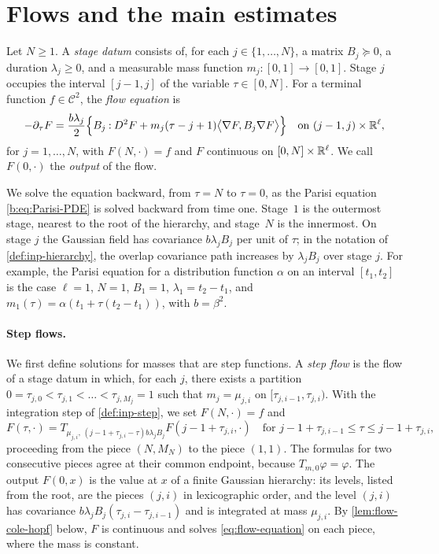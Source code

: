 \section{Flows and the main estimates}\label{sec:flow-statements}

\begin{definition}\label{def:flow}
Let $N\ge1$. A \emph{stage datum} consists of, for each $j\in\{1,\dots,N\}$, a
matrix $B_j\succeq0$, a duration $\lambda_j\ge0$, and a measurable mass function
$m_j\colon[0,1]\to[0,1]$. Stage $j$ occupies the interval $[j-1,j]$ of the
variable $\tau\in[0,N]$. For a terminal function $f\in\mathcal C^2$, the
\emph{flow equation} is
\begin{equation}\label{eq:flow-equation}
 -\partial_\tau F=\frac{b\lambda_j}{2}\Bigl\{B_j\mathbin{:}D^2F
 +m_j(\tau-j+1)\bigl\langle\nabla F,B_j\nabla F\bigr\rangle\Bigr\}
 \quad\text{on }(j-1,j)\times\mathbb R^\ell,
\end{equation}
for $j=1,\dots,N$, with $F(N,\cdot)=f$ and $F$ continuous on
$[0,N]\times\mathbb R^\ell$. We call $F(0,\cdot)$ the \emph{output} of the flow.
\end{definition}

We solve the equation backward, from $\tau=N$ to $\tau=0$, as the Parisi
equation \eqref{b:eq:Parisi-PDE} is solved backward from time one. Stage~$1$ is
the outermost stage, nearest to the root of the hierarchy, and stage~$N$ is the
innermost. On stage $j$ the Gaussian field has covariance $b\lambda_jB_j$ per unit
of $\tau$; in the notation of \cref{def:inp-hierarchy}, the overlap covariance
path increases by $\lambda_jB_j$ over stage $j$. For example, the Parisi equation
for a distribution function $\alpha$ on an interval $[t_1,t_2]$ is the case
$\ell=1$, $N=1$, $B_1=1$, $\lambda_1=t_2-t_1$, and
$m_1(\tau)=\alpha(t_1+\tau(t_2-t_1))$, with $b=\beta^2$.

\paragraph{Step flows.}
We first define solutions for masses that are step functions. A \emph{step
flow} is the flow of a stage datum in which, for each $j$, there exists a partition
$0=\tau_{j,0}<\tau_{j,1}<\dots<\tau_{j,M_j}=1$ such that $m_j=\mu_{j,i}$ on
$[\tau_{j,i-1},\tau_{j,i})$. With the integration step of
\cref{def:inp-step}, we set $F(N,\cdot)=f$ and
\begin{equation}\label{eq:flow-step-solution}
 F(\tau,\cdot)=T_{\mu_{j,i},\,(j-1+\tau_{j,i}-\tau)b\lambda_jB_j}
 F(j-1+\tau_{j,i},\cdot)
 \quad\text{for } j-1+\tau_{j,i-1}\le\tau\le j-1+\tau_{j,i},
\end{equation}
proceeding from the piece $(N,M_N)$ to the piece $(1,1)$. The formulas for two
consecutive pieces agree at their common endpoint, because
$T_{m,0}\varphi=\varphi$. The output $F(0,x)$ is the value at $x$ of a finite Gaussian hierarchy:
its levels, listed from the root, are the pieces $(j,i)$ in lexicographic order,
and the level $(j,i)$ has covariance $b\lambda_jB_j(\tau_{j,i}-\tau_{j,i-1})$ and
is integrated at mass $\mu_{j,i}$. By \cref{lem:flow-cole-hopf} below, $F$ is
continuous and solves \eqref{eq:flow-equation} on each piece, where the mass is
constant.

